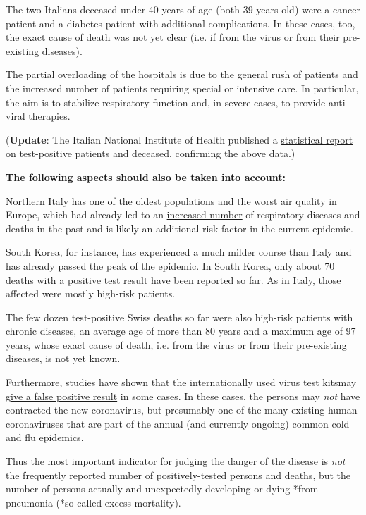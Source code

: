 The two Italians deceased under 40 years of age (both 39 years old) were
a cancer patient and a diabetes patient with additional complications.
In these cases, too, the exact cause of death was not yet clear (i.e. if
from the virus or from their pre-existing diseases).

The partial overloading of the hospitals is due to the general rush of
patients and the increased number of patients requiring special or
intensive care. In particular, the aim is to stabilize respiratory
function and, in severe cases, to provide anti-viral therapies.

(\textbf{Update}: The Italian National Institute of Health published a
\href{https://www.epicentro.iss.it/coronavirus/bollettino/Report-COVID-2019_17_marzo-v2.pdf}{statistical
report} on test-positive patients and deceased, confirming the above
data.)

\textbf{The following aspects should also be taken into account:}

Northern Italy has one of the oldest populations and the
\href{https://twitter.com/esa/status/1238480433047916545}{worst air
quality} in Europe, which had already led to an
\href{https://www.thelocal.it/20170131/our-lungs-are-breaking-smog-levels-way-above-safe-limits-in-northern-italy}{increased
number} of respiratory diseases and deaths in the past and is likely an
additional risk factor in the current epidemic.

South Korea, for instance, has experienced a much milder course than
Italy and has already passed the peak of the epidemic. In South Korea,
only about 70 deaths with a positive test result have been reported so
far. As in Italy, those affected were mostly high-risk patients.

The few dozen test-positive Swiss deaths so far were also high-risk
patients with chronic diseases, an average age of more than 80 years and
a maximum age of 97 years, whose exact cause of death, i.e. from the
virus or from their pre-existing diseases, is not yet known.

Furthermore, studies have shown that the internationally used virus test
kits\href{https://www.ncbi.nlm.nih.gov/pmc/articles/PMC2095096/}{may
give a false positive result} in some cases. In these cases, the persons
may \emph{not} have contracted the new coronavirus, but presumably one
of the many existing human coronaviruses that are part of the annual
(and currently ongoing) common cold and flu epidemics.

Thus the most important indicator for judging the danger of the disease
is \emph{not} the frequently reported number of positively-tested
persons and deaths, but the number of persons actually and unexpectedly
developing or dying *from pneumonia (*so-called excess mortality).

